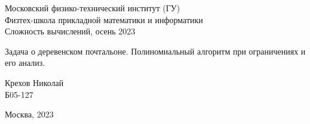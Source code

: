 \begin{center}

    \normalsize{Московский физико-технический институт (ГУ)}\\
    \normalsize{Физтех-школа прикладной математики и информатики}\\
    \normalsize{Сложность вычислений, осень 2023}\\
    
    \vspace{15em}
    
    \Large{Задача о деревенском почтальоне. Полиномиальный алгоритм при ограничениях и его анализ. }\\
    
\end{center}

\vspace{5em}

\begin{flushright} 
    \large{Крехов Николай}\\
    \large{Б05-127}
\end{flushright}

\vspace{\fill}

\begin{center} Москва, 2023 \end{center}
\thispagestyle{empty}